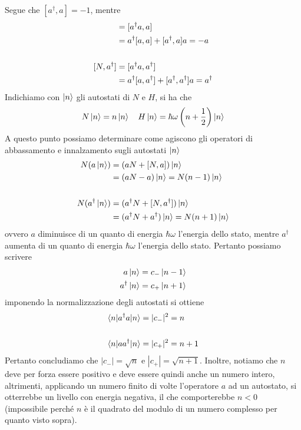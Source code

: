 \documentclass{article}
\begin{document}
Segue che $[a^\dagger, a] = -1$, mentre
\begin{align}
    [N, a] &= [a^\dagger a, a] \notag \\
    &= a^\dagger[a, a] + [a^\dagger, a]a = -a \notag \\ \notag \\
    [N, a^\dagger] &= [a^\dagger a, a^\dagger] \notag \\
    &= a^\dagger[a, a^\dagger] + [a^\dagger, a^\dagger]a = a^\dagger \notag
\end{align}
Indichiamo con $\ket{n}$ gli autostati di $N$ e $H$, si ha che
\begin{gather}
    N\ket{n} = n\ket{n} \quad H\ket{n} = \hbar\omega\left( n + \frac{1}{2} \right)\ket{n} \notag
\end{gather}
A questo punto possiamo determinare come agiscono gli operatori di abbassamento e innalzamento sugli autostati $\ket{n}$
\begin{align}
    N(a\ket{n}) &= (aN + [N, a])\ket{n} \notag \\
    &= (aN - a)\ket{n} = N(n -1)\ket{n} \notag \\ \notag \\
    N(a^\dagger\ket{n}) &= (a^\dagger N + [N, a^\dagger])\ket{n} \notag \\
    &= (a^\dagger N + a^\dagger)\ket{n} = N(n + 1)\ket{n} \notag 
\end{align}
ovvero $a$ diminuisce di un quanto di energia $\hbar\omega$ l'energia dello stato, mentre $a^\dagger$ aumenta di un quanto di energia $\hbar\omega$ l'energia dello stato. Pertanto possiamo scrivere
\begin{align}
    a\ket{n} &= c_-\ket{n - 1} \notag \\
    a^\dagger\ket{n} &= c_+\ket{n + 1} \notag
\end{align}
imponendo la normalizzazione degli autostati si ottiene
\begin{align}
    \braket{n|a^\dagger a|n} &= |c_-|^2 = n \notag \\ \notag \\
    \braket{n|aa^\dagger|n} &= |c_+|^2 = n + 1 \notag
\end{align}
Pertanto concludiamo che $|c_-| = \sqrt{n}$ e $|c_+| = \sqrt{n + 1}$. Inoltre, notiamo che $n$ deve per forza essere positivo e deve essere quindi anche un numero intero, altrimenti, applicando un numero finito di volte l'operatore $a$ ad un autostato, si otterrebbe un livello con energia negativa, il che comporterebbe $n < 0$ (impossibile perché $n$ è il quadrato del modulo di un numero complesso per quanto visto sopra). \\
\end{document}
